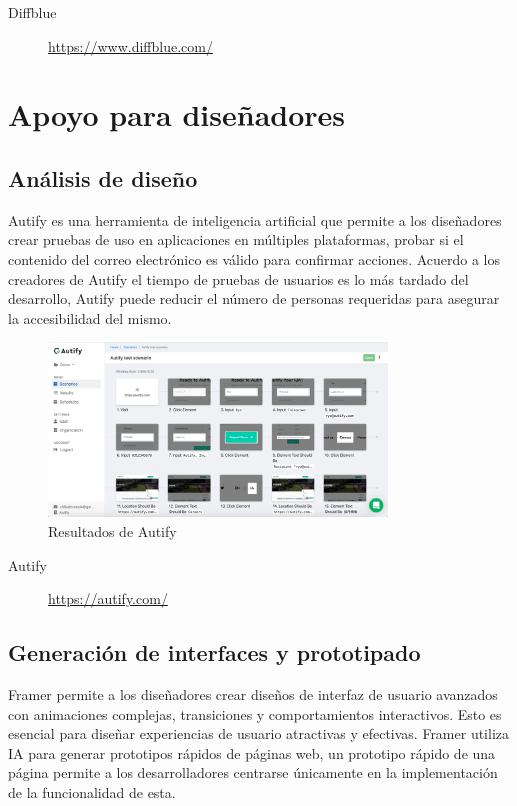 \documentclass[11pt]{article}
\begin{document}
\begin{description}
\item[{Diffblue}] \url{https://www.diffblue.com/}
\end{description}

\pagebreak

\section{Apoyo para diseñadores}
\label{sec:org5de3642}
\subsection{Análisis de diseño}
\label{sec:org97aba37}
Autify es una herramienta de inteligencia artificial que permite a los
diseñadores crear pruebas de uso en aplicaciones en múltiples
plataformas, probar si el contenido del correo electrónico es válido
para confirmar acciones. Acuerdo a los creadores de Autify el tiempo
de pruebas de usuarios es lo más tardado del desarrollo, Autify puede
reducir el número de personas requeridas para asegurar la
accesibilidad del mismo.  

\begin{figure}[htbp]
\centering
\includegraphics[width=9cm]{img/auty.png}
\caption{Resultados de Autify}
\end{figure}

\begin{description}
\item[{Autify}] \url{https://autify.com/}
\end{description}

\subsection{Generación de interfaces y prototipado}
\label{sec:org162a40d}
Framer permite a los diseñadores crear diseños de interfaz de usuario
avanzados con animaciones complejas, transiciones y comportamientos
interactivos. Esto es esencial para diseñar experiencias de usuario
atractivas y efectivas. Framer utiliza IA para generar prototipos
rápidos de páginas web, un prototipo rápido de una página permite a
los desarrolladores centrarse únicamente en la implementación de la
funcionalidad de esta. 
\end{document}

